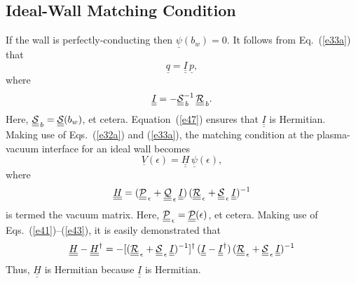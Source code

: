 \documentclass[12pt,prb,aps,notitlepage]{revtex4-1}
\begin{document}
\subsection{Ideal-Wall Matching Condition}
If the wall is perfectly-conducting then  $\underline{\psi}(b_w)=0$. 
It follows from Eq.~(\ref{e33a}) that
\begin{equation}
\underline{q} = \underline{\underline{I}}\,\underline{p},
\end{equation}
where
\begin{equation}
 \underline{\underline{I}}=- \underline{\underline{\cal S}}_{\,b}^{-1}\,\underline{\underline{\cal R}}_{\,b}.
 \end{equation}
 Here, $\underline{\underline{\cal S}}_{\,b}= \underline{\underline{\cal S}}(b_w)$, et cetera. Equation~(\ref{e47}) ensures that $ \underline{\underline{I}}$
 is Hermitian. 
  Making use of Eqs.~(\ref{e32a}) and (\ref{e33a}),  the matching condition at the plasma-vacuum interface  for an ideal wall becomes 
 \begin{equation}
 \underline{V}(\epsilon)= \underline{\underline{H}}\,\underline{\psi}(\epsilon),
 \end{equation}
 where 
 \begin{equation}
 \underline{\underline{H}}= (\underline{\underline{\cal P}}_{\,\epsilon}+\underline{\underline{\cal Q}}_{\,\epsilon}\,\underline{\underline{I}})\,(\underline{\underline{\cal R}}_{\,\epsilon}+\underline{\underline{\cal S}}_{\,\epsilon}\,\underline{\underline{I}})^{-1}
 \end{equation}
 is termed the vacuum matrix. 
  Here, $\underline{\underline{\cal P}}_{\,\epsilon}= \underline{\underline{\cal P}}(\epsilon)$, et cetera. 
Making use of Eqs.~(\ref{e41})--(\ref{e43}), it is easily demonstrated that
 \begin{equation}\label{e53}
 \underline{\underline{H}}-\underline{\underline{H}}^\dag =- [(\underline{\underline{\cal R}}_{\,\epsilon}+\underline{\underline{\cal S}}_{\,\epsilon}\,\underline{\underline{I}})^{-1}]^{\dag}\,(\underline{\underline{I}} -\underline{\underline{I}}^\dag)\,  (\underline{\underline{\cal R}}_{\,\epsilon}+\underline{\underline{\cal S}}_{\,\epsilon}\,\underline{\underline{I}})^{-1}
\end{equation}
Thus,  $\underline{\underline{H}}$ is Hermitian because  $\underline{\underline{I}}$ is Hermitian. 
 
\end{document}
